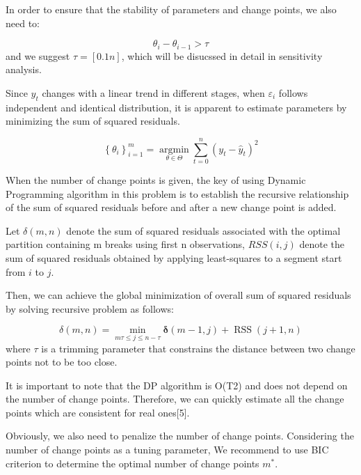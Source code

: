 \documentclass[12pt]{article}  %
\begin{document}
	In order to ensure that the stability of parameters and change points, we also need to:
	
	\begin{equation}
		\theta_{i}-\theta_{i-1}>\tau
	\end{equation}
	and we suggest $ \tau = [0.1n] $, which will be disucssed in detail in sensitivity analysis.
	
	Since $y_{t}$ changes with a linear trend in different stages, when $\varepsilon_{i}$ follows independent and identical distribution, it is apparent to estimate parameters by minimizing the sum of squared residuals.
	
	\begin{equation}
		\left\{\theta_{i}\right\}_{i=1}^{m}=\underset{\theta \in \Theta}{\operatorname{argmin}} \sum_{t=0}^{n}\left(y_{t}-\widehat{y}_{t}\right)^{2}
	\end{equation}
	
	When the number of change points is given, the key of using Dynamic Programming algorithm in this problem is to establish the recursive relationship of the sum of squared residuals before and after a new change point is added.
	
	Let $ \delta(m, n) $ denote the sum of squared residuals associated with the optimal partition containing m breaks using first n observations, $ RSS(i, j) $ denote the sum of squared residuals obtained by applying least-squares to a segment start from $ i $ to $ j $.
	
	Then, we can achieve the global minimization of overall sum of squared residuals by solving recursive problem as follows:
	
	\begin{equation}
		\delta(m, n)=\min _{m \tau \leq j \leq n-\tau} \boldsymbol{\delta}(m-1, j)+\operatorname{RSS}(j+1, n)
	\end{equation}
	where $ \tau $ is a trimming parameter that constrains the distance between two change points not to be too close.
	
	It is important to note that the DP algorithm is O(T2) and does not depend on the number of change points. Therefore, we can quickly estimate all the change points which are consistent for real ones[5].
	
	Obviously, we also need to penalize the number of change points. Considering the number of change points as a tuning parameter, We recommend to use BIC criterion to determine the optimal number of change points $ m^{*} $.
	
\end{document}
